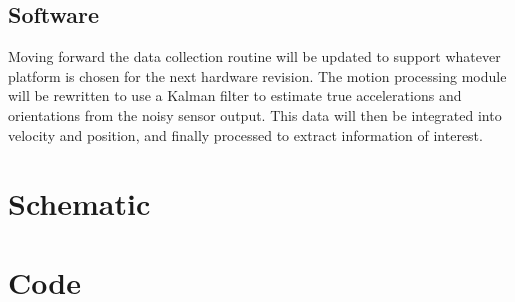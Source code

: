 \documentclass[11pt,oneside]{amsart}
\begin{document}
\subsection{Software}
Moving forward the data collection routine will be updated to support whatever platform is chosen for the next hardware revision. The motion processing module will be rewritten to use a Kalman filter to estimate true accelerations and orientations from the noisy sensor output. This data will then be integrated into velocity and position, and finally processed to extract information of interest. 
\newpage
\begin{appendix}
\section{Schematic}
\label{sec:schematic}

\section{Code}


\end{appendix}
\end{document}
